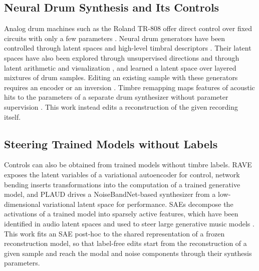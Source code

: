 \subsection{Neural Drum Synthesis and Its Controls}
Analog drum machines such as the Roland TR-808 offer direct control over fixed circuits with only a few parameters \citep{werner2014physically,werner2014tr808}.
Neural drum generators have been controlled through latent spaces \citep{aouameur2019neural,drysdale2020adversarial} and high-level timbral descriptors \citep{ramires2020neural,nistal2020drumgan,lavault2022stylewavegan}.
Their latent spaces have also been explored through unsupervised directions \citep{ramires2022study} and through latent arithmetic and visualization \citep{drysdale2024latent}, and \citet{waissbluth2022synthesis} learned a latent space over layered mixtures of drum samples.
Editing an existing sample with these generators requires an encoder or an inversion \citep{nistal2022drumganvst}.
Timbre remapping maps features of acoustic hits to the parameters of a separate drum synthesizer without parameter supervision \citep{shier2024realtime,shier2025designing}.
This work instead edits a reconstruction of the given recording itself.

\subsection{Steering Trained Models without Labels}
Controls can also be obtained from trained models without timbre labels.
RAVE \citep{caillon2021rave} exposes the latent variables of a variational autoencoder for control, network bending \citep{broad2022network} inserts transformations into the computation of a trained generative model, and PLAUD \citep{kotowski2026plaud} drives a NoiseBandNet-based synthesizer from a low-dimensional variational latent space for performance.
SAEs \citep{gao2025scaling} decompose the activations of a trained model into sparsely active features, which have been identified in audio latent spaces \citep{paek2025learning} and used to steer large generative music models \citep{singh2026discovering}.
This work fits an SAE post-hoc to the shared representation of a frozen reconstruction model, so that label-free edits start from the reconstruction of a given sample and reach the modal and noise components through their synthesis parameters.